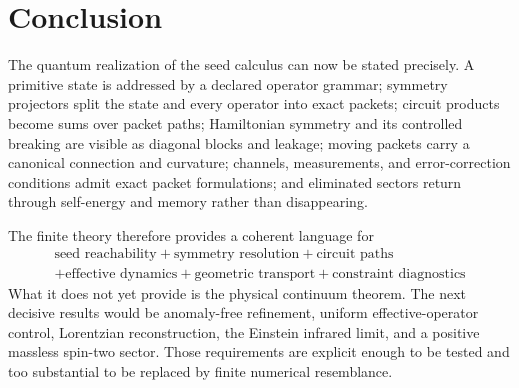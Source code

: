 \setcounter{section}{14}
\section{Conclusion}\label{core:section:014}

The quantum realization of the seed calculus can now be stated precisely. A primitive state is addressed by a declared operator grammar; symmetry projectors split the state and every operator into exact packets; circuit products become sums over packet paths; Hamiltonian symmetry and its controlled breaking are visible as diagonal blocks and leakage; moving packets carry a canonical connection and curvature; channels, measurements, and error-correction conditions admit exact packet formulations; and eliminated sectors return through self-energy and memory rather than disappearing.

The finite theory therefore provides a coherent language for
\[
\boxed{
\begin{gathered}
\text{seed reachability}
+
\text{symmetry resolution}
+
\text{circuit paths}\\
+
\text{effective dynamics}
+
\text{geometric transport}
+
\text{constraint diagnostics}
\end{gathered}
}
\]
What it does not yet provide is the physical continuum theorem. The next decisive results would be anomaly-free refinement, uniform effective-operator control, Lorentzian reconstruction, the Einstein infrared limit, and a positive massless spin-two sector. Those requirements are explicit enough to be tested and too substantial to be replaced by finite numerical resemblance.



